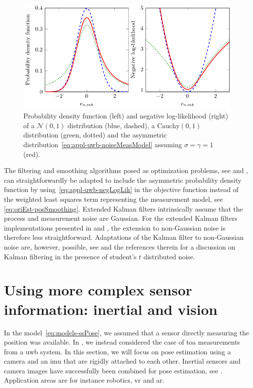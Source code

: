 \begin{figure}
	\centering
	\includegraphics[scale = 1]{figure6_2.pdf}
		\caption{Probability density function (left) and negative log-likelihood (right) of a $\mathcal{N}(0,1)$ distribution (blue, dashed), a $\text{Cauchy}(0,1)$ distribution (green, dotted) and the asymmetric distribution~\eqref{eq:appl-uwb-noiseMeasModel} assuming $\sigma = \gamma = 1$ (red).}
	\label{fig:appl-uwb-loglikelihood}
\end{figure}

The filtering and smoothing algorithms posed as optimization problems, see  and , can straightforwardly be adapted to include the asymmetric probability density function by using~\eqref{eq:appl-uwb-negLogLik} in the objective function instead of the weighted least squares term representing the measurement model, see \eg \eqref{eq:oriEst-posSmoothing}. Extended Kalman filters intrinsically assume that the process and measurement noise are Gaussian. For the extended Kalman filters implementations presented in  and , the extension to non-Gaussian noise is therefore less straightforward. Adaptations of the Kalman filter to non-Gaussian noise are, however, possible, see \eg \cite{rothAOG:2017} and the references therein for a discussion on Kalman filtering in the presence of student's $t$ distributed noise.

\section{Using more complex sensor information: inertial and vision}
\label{sec:appl-vision}
In the model~\eqref{eq:models-ssPose}, we assumed that a sensor directly measuring the position was available. In , we instead considered the case of \gls{toa} measurements from a \gls{uwb} system. In this section, we will focus on pose estimation using a camera and an \gls{imu} that are rigidly attached to each other. Inertial sensors and camera images have successfully been combined for pose estimation, see \eg \cite{brysonJS:2009,luptonS:2012,jungT:2001,sjanicSG:2017,leuteneggerLBSF:2015,forsterCDS:2016,bleserS:2009,foxlinN:2003,nyqvistG:2013}. Application areas are for instance robotics, \acrlong{vr} and \acrlong{ar}.

